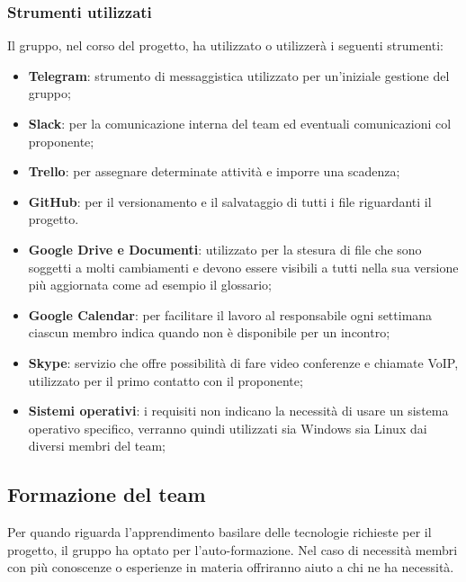 		\subsubsection{Strumenti utilizzati}
		Il gruppo, nel corso del progetto, ha utilizzato o utilizzerà i seguenti strumenti:
		\begin{itemize}
			\item \textbf{Telegram}: strumento di messaggistica utilizzato per un'iniziale gestione del gruppo;
			\item \textbf{Slack}: per la comunicazione interna del team ed eventuali comunicazioni col proponente;
			\item \textbf{Trello}: per assegnare determinate attività e imporre una scadenza;
			\item \textbf{GitHub}: per il versionamento e il salvataggio di tutti i file riguardanti il progetto.
			\item \textbf{Google Drive e Documenti}: utilizzato per la stesura di file che sono soggetti a molti cambiamenti e devono essere visibili a tutti nella sua versione più aggiornata come ad esempio il glossario;
			\item \textbf{Google Calendar}: per facilitare il lavoro al responsabile ogni settimana ciascun membro indica quando non è disponibile per un incontro;
			\item \textbf{Skype}: servizio che offre possibilità di fare video conferenze e chiamate VoIP, utilizzato per il primo contatto con il proponente;
			\item \textbf{Sistemi operativi}: i requisiti non indicano la necessità di usare un sistema operativo specifico, verranno quindi utilizzati sia Windows sia Linux dai diversi membri del team; %
		\end{itemize}
	\subsection{Formazione del team}
	Per quando riguarda l'apprendimento basilare delle tecnologie richieste per il progetto, il gruppo ha optato per l'auto-formazione. Nel caso di necessità membri con più conoscenze o esperienze in materia offriranno aiuto a chi ne ha necessità.			